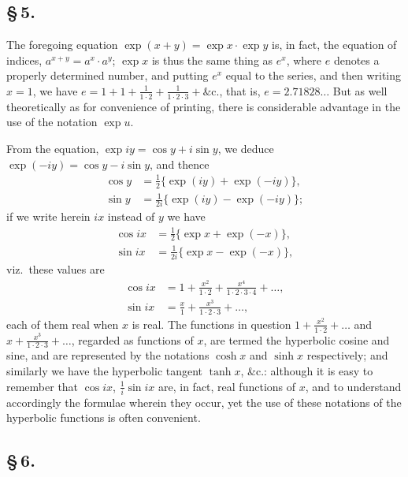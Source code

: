 \documentclass[11pt,a4paper]{book}
\begin{document}
\subsection*{\S\,5.}

The foregoing equation $\exp(x + y) = \exp x \cdot \exp y$ is, in fact, the equation of indices, $a^{x+y} = a^{x} \cdot a^{y}$; $\exp x$ is thus the same thing as $e^{x}$, where $e$ denotes a properly determined number, and putting $e^{x}$ equal to the series, and then writing $x = 1$, we have $e = 1 + 1 + \frac{1}{1 \cdot 2} + \frac{1}{1 \cdot 2 \cdot 3} + \&$c., that is, $e = 2.71828\ldots$ But as well theoretically as for convenience of printing, there is considerable advantage in the use of the notation $\exp u$.

From the equation, $\exp iy = \cos y + i\sin y$, we deduce $\exp(-iy) = \cos y - i\sin y$, and thence
\begin{align*}
\cos y &= \tfrac{1}{2}\{\exp(iy) + \exp(-iy)\}, \\
\sin y &= \tfrac{1}{2i}\{\exp(iy) - \exp(-iy)\};
\end{align*}
if we write herein $ix$ instead of $y$ we have
\begin{align*}
\cos ix &= \tfrac{1}{2}\{\exp x + \exp(-x)\}, \\
\sin ix &= \tfrac{1}{2i}\{\exp x - \exp(-x)\},
\end{align*}
viz.\ these values are
\begin{align*}
\cos ix &= 1 + \frac{x^{2}}{1 \cdot 2} + \frac{x^{4}}{1 \cdot 2 \cdot 3 \cdot 4} + \ldots, \\
\sin ix &= \frac{x}{1} + \frac{x^{3}}{1 \cdot 2 \cdot 3} + \ldots,
\end{align*}
each of them real when $x$ is real. The functions in question $1 + \frac{x^{2}}{1 \cdot 2} + \ldots$ and $x + \frac{x^{3}}{1 \cdot 2 \cdot 3} + \ldots$, regarded as functions of $x$, are termed the hyperbolic cosine and sine, and are represented by the notations $\cosh x$ and $\sinh x$ respectively; and similarly we have the hyperbolic tangent $\tanh x$, \&c.: although it is easy to remember that $\cos ix$, $\frac{1}{i}\sin ix$ are, in fact, real functions of $x$, and to understand accordingly the formulae wherein they occur, yet the use of these notations of the hyperbolic functions is often convenient.

\subsection*{\S\,6.}
\end{document}
